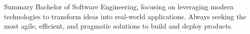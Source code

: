 \begin{rubric}{Summary}
\entry*[]%
    Bachelor of Software Engineering, focusing on leveraging modern technologies to transform ideas into real-world applications. Always seeking the most agile, efficient, and pragmatic solutions to build and deploy products.
\end{rubric}